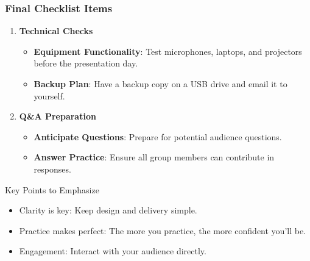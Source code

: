 \documentclass[aspectratio=169]{beamer}
\begin{document}
\begin{frame}[fragile]
    \frametitle{Final Checklist Items}
    \begin{enumerate}[resume]
        \item \textbf{Technical Checks}
            \begin{itemize}
                \item \textbf{Equipment Functionality}: Test microphones, laptops, and projectors before the presentation day.
                \item \textbf{Backup Plan}: Have a backup copy on a USB drive and email it to yourself.
            \end{itemize}

        \item \textbf{Q\&A Preparation}
            \begin{itemize}
                \item \textbf{Anticipate Questions}: Prepare for potential audience questions.
                \item \textbf{Answer Practice}: Ensure all group members can contribute in responses.
            \end{itemize}
    \end{enumerate}

    \begin{block}{Key Points to Emphasize}
        \begin{itemize}
            \item Clarity is key: Keep design and delivery simple.
            \item Practice makes perfect: The more you practice, the more confident you'll be.
            \item Engagement: Interact with your audience directly.
        \end{itemize}
    \end{block}
\end{frame}
\end{document}
